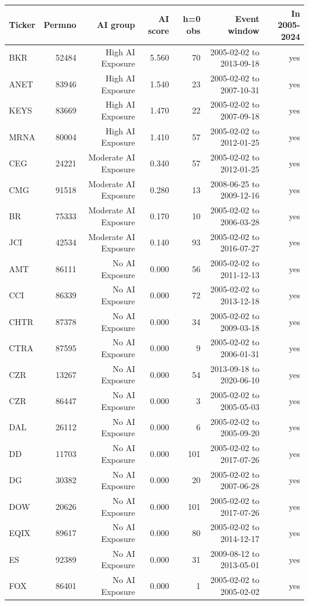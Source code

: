 \begin{tabular}{lrrrrrr}
\toprule
Ticker & Permno & AI group & AI score & h=0 obs & Event window & In 2005-2024 \\
\midrule
BKR & 52484 & High AI Exposure & 5.560 & 70 & 2005-02-02 to 2013-09-18 & yes \\
ANET & 83946 & High AI Exposure & 1.540 & 23 & 2005-02-02 to 2007-10-31 & yes \\
KEYS & 83669 & High AI Exposure & 1.470 & 22 & 2005-02-02 to 2007-09-18 & yes \\
MRNA & 80004 & High AI Exposure & 1.410 & 57 & 2005-02-02 to 2012-01-25 & yes \\
CEG & 24221 & Moderate AI Exposure & 0.340 & 57 & 2005-02-02 to 2012-01-25 & yes \\
CMG & 91518 & Moderate AI Exposure & 0.280 & 13 & 2008-06-25 to 2009-12-16 & yes \\
BR & 75333 & Moderate AI Exposure & 0.170 & 10 & 2005-02-02 to 2006-03-28 & yes \\
JCI & 42534 & Moderate AI Exposure & 0.140 & 93 & 2005-02-02 to 2016-07-27 & yes \\
AMT & 86111 & No AI Exposure & 0.000 & 56 & 2005-02-02 to 2011-12-13 & yes \\
CCI & 86339 & No AI Exposure & 0.000 & 72 & 2005-02-02 to 2013-12-18 & yes \\
CHTR & 87378 & No AI Exposure & 0.000 & 34 & 2005-02-02 to 2009-03-18 & yes \\
CTRA & 87595 & No AI Exposure & 0.000 & 9 & 2005-02-02 to 2006-01-31 & yes \\
CZR & 13267 & No AI Exposure & 0.000 & 54 & 2013-09-18 to 2020-06-10 & yes \\
CZR & 86447 & No AI Exposure & 0.000 & 3 & 2005-02-02 to 2005-05-03 & yes \\
DAL & 26112 & No AI Exposure & 0.000 & 6 & 2005-02-02 to 2005-09-20 & yes \\
DD & 11703 & No AI Exposure & 0.000 & 101 & 2005-02-02 to 2017-07-26 & yes \\
DG & 30382 & No AI Exposure & 0.000 & 20 & 2005-02-02 to 2007-06-28 & yes \\
DOW & 20626 & No AI Exposure & 0.000 & 101 & 2005-02-02 to 2017-07-26 & yes \\
EQIX & 89617 & No AI Exposure & 0.000 & 80 & 2005-02-02 to 2014-12-17 & yes \\
ES & 92389 & No AI Exposure & 0.000 & 31 & 2009-08-12 to 2013-05-01 & yes \\
FOX & 86401 & No AI Exposure & 0.000 & 1 & 2005-02-02 to 2005-02-02 & yes \\

\end{tabular}
